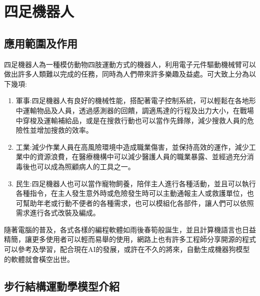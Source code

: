 \chapter{四足機器人}
\section{應用範圍及作用}
四足機器人為一種模仿動物四肢運動方式的機器人，利用電子元件驅動機械臂可以做出許多人類難以完成的任務，同時為人們帶來許多樂趣及益處。可大致上分為以下幾項:\
\begin{enumerate}
\item 軍事:四足機器人有良好的機械性能，搭配著電子控制系統，可以輕鬆在各地形中運輸物品及人員，透過感測器的回饋，調適馬達的行程及出力大小，在戰場中穿梭及運輸補給品，或是在搜救行動也可以當作先鋒隊，減少搜救人員的危險性並增加搜救的效率。\
\item 工業:減少作業人員在高風險環境中造成職業傷害，並保持高效的運作，減少工業中的資源浪費，在醫療機構中可以減少醫護人員的職業暴露、並經過充分消毒後也可以成為照顧病人的工具之一。\
\item 民生:四足機器人也可以當作寵物飼養，陪伴主人進行各種活動，並且可以執行各種指令，在主人發生意外時或危險發生時可以主動通報主人或救護單位，也可幫助年老或行動不便者的各種需求，也可以模組化各部件，讓人們可以依照需求進行各式改裝及編成。\
\end{enumerate}
隨著電腦的普及，各式各樣的編程軟體如雨後春筍般誕生，並且計算機語言也日益精簡，讓更多使用者可以輕而易舉的使用，網路上也有許多工程師分享開源的程式可以參考及學習，配合現在AI的發展，或許在不久的將來，自動生成機器狗模型的軟體就會橫空出世。\\[6pt]
\newpage
\section{步行結構運動學模型介紹}

